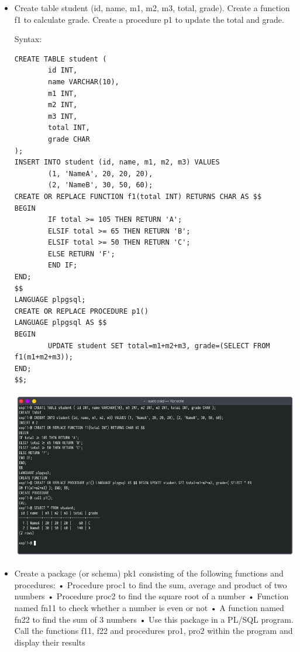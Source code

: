 \documentclass[13pt,oneside]{book}
\begin{document}
\begin{itemize}
\item
Create table student (id, name, m1, m2, m3, total, grade). Create a function f1 to
 calculate grade. Create a procedure p1 to update the total and grade.
 
Syntax:
\begin{verbatim}
CREATE TABLE student (
        id INT,
        name VARCHAR(10),
        m1 INT,
        m2 INT,
        m3 INT,
        total INT,
        grade CHAR
);
INSERT INTO student (id, name, m1, m2, m3) VALUES 
        (1, 'NameA', 20, 20, 20),
        (2, 'NameB', 30, 50, 60);
CREATE OR REPLACE FUNCTION f1(total INT) RETURNS CHAR AS $$
BEGIN
        IF total >= 105 THEN RETURN 'A';
        ELSIF total >= 65 THEN RETURN 'B';
        ELSIF total >= 50 THEN RETURN 'C';
        ELSE RETURN 'F';
        END IF;
END;
$$
LANGUAGE plpgsql;
CREATE OR REPLACE PROCEDURE p1()
LANGUAGE plpgsql AS $$
BEGIN
        UPDATE student SET total=m1+m2+m3, grade=(SELECT FROM f1(m1+m2+m3));
END;
$$;

\end{verbatim}
\includegraphics[width=\textwidth]{img/p12/ss3.png}


\item
Create a package (or schema) pk1 consisting of the following functions and
 procedures:
 • Procedure proc1 to find the sum, average and product of two numbers
 • Procedure proc2 to find the square root of a number
 • Function named fn11 to check whether a number is even or not
 • A function named fn22 to find the sum of 3 numbers
 • Use this package in a PL/SQL program. Call the functions f11, f22 and procedures
 pro1, pro2 within the program and display their results


\end{itemize}
\end{document}
